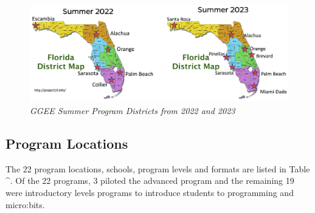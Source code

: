 \documentclass[
]{article}
\begin{document}
\begin{figure}
\centering
\includegraphics{Images/GGEE_23_FL District Map.jpg}
\caption{\emph{GGEE Summer Program Districts from 2022 and 2023}}
\end{figure}

\hypertarget{program-locations}{%
\subsection{Program Locations}\label{program-locations}}

The 22 program locations, schools, program levels and formats are listed
in Table \^{}. Of the 22 programs, 3 piloted the advanced program and
the remaining 19 were introductory levels programs to introduce students
to programming and micro:bits.
\end{document}

